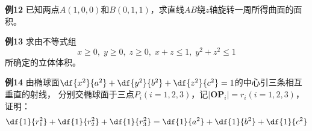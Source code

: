 \begin{frame}
	\linespread{1.2}
	\begin{exampleblock}{{\bf 例12}\hfill}
		已知两点$A(1,0,0)$和$B(0,1,1)$，求直线$AB$绕$z$轴旋转一周所得曲面的面积。
	\end{exampleblock}
\end{frame}

\begin{frame}
	\linespread{1.2}
	\begin{exampleblock}{{\bf 例13}\hfill}
		求由不等式组
		$$x\geq 0,\;y\geq 0,\;z\geq 0,\;x+z\leq 1,\; y^2+z^2\leq 1$$
		所确定的立体体积。
	\end{exampleblock}
\end{frame}

\begin{frame}
	\linespread{1.5}
	\begin{exampleblock}{{\bf 例14}\hfill}
		由椭球面$\df{x^2}{a^2}+\df{y^2}{b^2}+\df{z^2}{c^2}=1$的中心引三条相互垂直的射线，
		分别交椭球面于三点$P_i(i=1,2,3)$，记$|\bm{OP}_i|=r_i(i=1,2,3)$，证明：
		$$\df{1}{r_1^2}+\df{1}{r_2^2}+\df{1}{r_3^2}
		=\df{1}{a^2}+\df{1}{b^2}+\df{1}{c^2}$$
	\end{exampleblock}
\end{frame}


